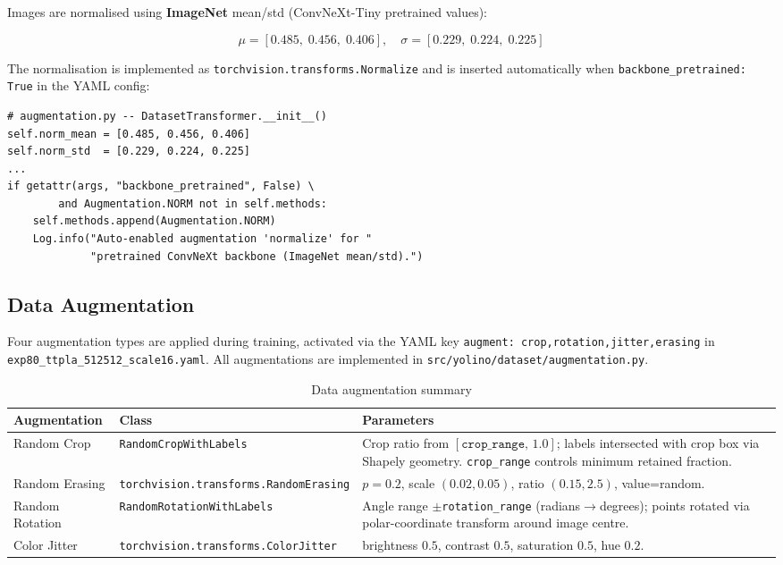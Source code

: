 \documentclass[11pt,a4paper]{article}
\begin{document}
Images are normalised using \textbf{ImageNet} mean/std (ConvNeXt-Tiny pretrained values):

\[
\mu = [0.485,\; 0.456,\; 0.406], \quad
\sigma = [0.229,\; 0.224,\; 0.225]
\]

The normalisation is implemented as \texttt{torchvision.transforms.Normalize} and is
inserted automatically when \texttt{backbone\_pretrained: True} in the YAML config:

\begin{lstlisting}
# augmentation.py -- DatasetTransformer.__init__()
self.norm_mean = [0.485, 0.456, 0.406]
self.norm_std  = [0.229, 0.224, 0.225]
...
if getattr(args, "backbone_pretrained", False) \
        and Augmentation.NORM not in self.methods:
    self.methods.append(Augmentation.NORM)
    Log.info("Auto-enabled augmentation 'normalize' for "
             "pretrained ConvNeXt backbone (ImageNet mean/std).")
\end{lstlisting}

\subsection{Data Augmentation}
\label{subsec:augmentation}

Four augmentation types are applied during training, activated via the YAML key
\texttt{augment: crop,rotation,jitter,erasing} in
\texttt{exp80\_ttpla\_512512\_scale16.yaml}.
All augmentations are implemented in \texttt{src/yolino/dataset/augmentation.py}.

\begin{table}[H]
\centering
\caption{Data augmentation summary}
\begin{tabular}{llp{7cm}}
\toprule
Augmentation & Class & Parameters \\
\midrule
Random Crop &
  \texttt{RandomCropWithLabels} &
  Crop ratio from $[\texttt{crop\_range},\, 1.0]$;
  labels intersected with crop box via Shapely geometry.
  \texttt{crop\_range} controls minimum retained fraction. \\[4pt]
Random Erasing &
  \texttt{torchvision.transforms.RandomErasing} &
  $p=0.2$, scale $(0.02, 0.05)$, ratio $(0.15, 2.5)$, value=random. \\[4pt]
Random Rotation &
  \texttt{RandomRotationWithLabels} &
  Angle range $\pm$\texttt{rotation\_range} (radians$\to$degrees);
  points rotated via polar-coordinate transform around image centre. \\[4pt]
Color Jitter &
  \texttt{torchvision.transforms.ColorJitter} &
  brightness $0.5$, contrast $0.5$, saturation $0.5$, hue $0.2$. \\
\bottomrule
\end{tabular}
\end{table}
\end{document}
